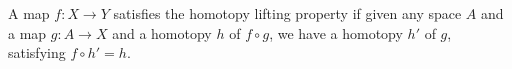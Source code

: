 \documentclass[12pt]{article}
\begin{document}
A map $f:X \to Y$ satisfies the homotopy lifting property if given any space $A$ and a map $g:A \to X$ and a homotopy $h$ of $f \circ g$, we have a homotopy $h'$ of $g$, satisfying $f \circ h'=h$.
\end{document}

